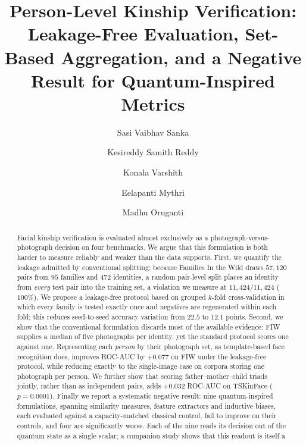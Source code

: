 \documentclass[preprint,12pt]{elsarticle}
\begin{document}
\begin{frontmatter}

\title{Person-Level Kinship Verification: Leakage-Free Evaluation, Set-Based
Aggregation, and a Negative Result for Quantum-Inspired Metrics}

\author[1]{Sasi Vaibhav Sanka}
\author[1]{Kesireddy Samith Reddy}
\author[1]{Konala Varshith}
\author[1]{Eelapanti Mythri}
\author[1]{Madhu Oruganti}

\address[1]{Department of Artificial Intelligence and Data Science, Koneru Lakshmaiah Education Foundation, Hyderabad-500075, India}



\begin{abstract}
Facial kinship verification is evaluated almost exclusively as a
photograph-versus-photograph decision on four benchmarks. We argue that this
formulation is both harder to measure reliably and weaker than the data
supports. First, we quantify the leakage admitted by conventional splitting:
because Families In the Wild draws $57{,}120$ pairs from $95$ families and
$472$ identities, a random pair-level split places an identity from
\emph{every} test pair into the training set, a violation we measure at
$11{,}424/11{,}424$ ($100\%$). We propose a leakage-free protocol based on
grouped $k$-fold cross-validation in which every family is tested exactly once
and negatives are regenerated within each fold; this reduces seed-to-seed
accuracy variation from $22.5$ to $12.1$ points. Second, we show that the
conventional formulation discards most of the available evidence: FIW supplies
a median of five photographs per identity, yet the standard protocol scores one
against one. Representing each \emph{person} by their photograph set, as
template-based face recognition does, improves ROC-AUC by $+0.077$ on FIW under
the leakage-free protocol, while reducing exactly to the single-image case on
corpora storing one photograph per person. We further show that scoring
father--mother--child triads jointly, rather than as independent pairs, adds
$+0.032$ ROC-AUC on TSKinFace ($p = 0.0001$). Finally we report a systematic
negative result: nine quantum-inspired formulations, spanning similarity
measures, feature extractors and inductive biases, each evaluated against a
capacity-matched classical control, fail to improve on their controls, and four
are significantly worse. Each of the nine reads its decision out of the quantum
state as a single scalar; a companion study shows that this readout is itself a

\end{abstract}
\end{frontmatter}
\end{document}
